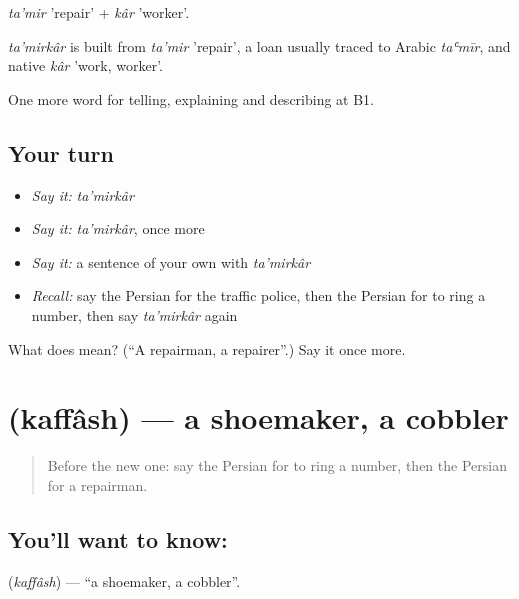 \emph{ta'mir} 'repair' + \emph{kâr} 'worker'.

\begin{cousinweb}
\emph{ta'mirkâr} is built from \emph{ta'mir} 'repair', a loan usually traced to Arabic \emph{taʿmīr}, and native \emph{kâr} 'work, worker'.
\end{cousinweb}

\begin{grammarlens}[title={What you've built}]
One more word for telling, explaining and describing at B1.
\end{grammarlens}

\subsection*{Your turn}
\begin{itemize}
\raggedright
  \item \emph{Say it:} \emph{ta'mirkâr}
  \item \emph{Say it:} \emph{ta'mirkâr}, once more
  \item \emph{Say it:} a sentence of your own with \emph{ta'mirkâr}
  \item \emph{Recall:} say the Persian for the traffic police, then the Persian for to ring a number, then say \emph{ta'mirkâr} again
\end{itemize}

\begin{tcolorbox}[breakable,colback=teal!4,colframe=teal!35!black,title={Before you move on}]
What does  mean? (\textquotedblleft{}A repairman, a repairer\textquotedblright{}.) Say it once more.
\end{tcolorbox}
\section[\texorpdfstring{\fa{کفاش} (kaffâsh)}{کفاش (kaffâsh)}]{ (kaffâsh) — a shoemaker, a cobbler}

\label{lesson:FA-C454-kaffash}



\begin{quote}
Before the new one: say the Persian for to ring a number, then the Persian for a repairman.
\end{quote}

\subsection*{You'll want to know: }
\textbf{} (\emph{kaffâsh}) — \textquotedblleft{}a shoemaker, a cobbler\textquotedblright{}.

